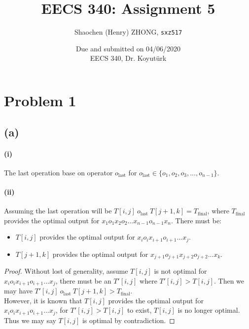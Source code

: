 \documentclass[11pt]{article}
\newcommand{\ilc}{\texttt}
\begin{document}
\title{\textbf{EECS 340: Assignment 5}}

\author{Shaochen (Henry) ZHONG, \ilc{sxz517}}
\date{Due and submitted on 04/06/2020 \\ EECS 340, Dr. Koyut{\"u}rk}
\maketitle

\section{Problem 1}

\subsection{(a)}

\paragraph{(i)}

The last operation base on operator $o_{\text{last}}$ for $o_{\text{last}} \in \{o_1, o_2, o_3, ..., o_{n-1}\}$.

\paragraph{(ii)} Assuming the last operation will be $T[i, j] \ o_{\text{last}} \ T[j+1, k] = T_{\text{final}}$, where $T_{\text{final}}$ provides the optimal output for $x_1 o_1 x_2 o_2 ... x_{n-1} o_{n-1} x_n$. There must be:


\begin{itemize}
    \item $T[i, j]$ provides the optimal output for $x_i o_i x_{i+1} o_{i+1} ... x_{j}$.
    \item $T[j+1, k]$ provides the optimal output for $x_{j+1} o_{j+1} x_{j+2} o_{j+2} ... x_{k}$.
\end{itemize}

\begin{proof}
    Without lost of generality, assume $T[i, j]$ is not optimal for $x_i o_i x_{i+1} o_{i+1} ... x_{j}$, there must be an $T'[i, j]$ where $T'[i, j] > T[i,j]$. Then we may have $T'[i, j] \ o_{\text{last}} \ T[j+1, k] > T_{\text{final}}$. \\
    However, it is known that $T[i, j]$ provides the optimal output for $x_i o_i x_{i+1} o_{i+1} ... x_{j}$, for $T'[i, j] > T[i,j]$ to exist,  $T[i, j]$ is no longer optimal. Thus we may say $T[i, j]$ is optimal by contradiction.
\end{proof}
\end{document}
